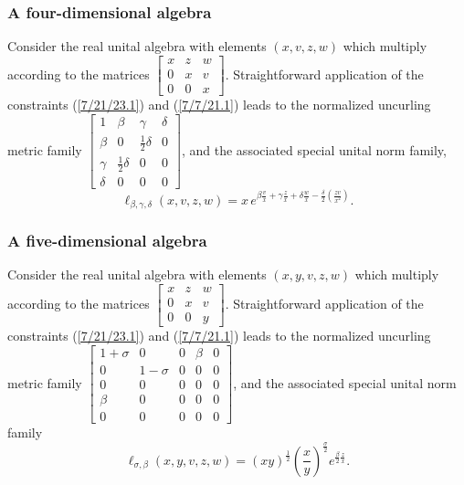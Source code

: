 \documentclass{amsart}
\numberwithin{equation}{section}
\theoremstyle{definition}
\numberwithin{theorem}{section}
\begin{document}
 \subsubsection{A four-dimensional algebra} Consider the real unital algebra with elements 
$(x,v,z,w)$ which multiply according to the matrices 
$\left[
\begin{array}{ccccc}
x & z & w   \\
0 & x & v \\
0 & 0 & x  
\end{array}
\right]$.
Straightforward application of the constraints (\ref{7/21/23.1}) and (\ref{7/7/21.1}) leads to the normalized uncurling metric family 
$\left[
\begin{array}{cccc}
1 & \beta & \gamma & \delta   \\
\beta & 0 & \frac{1}{2}\delta & 0 \\
\gamma & \frac{1}{2}\delta &  0 & 0   \\
\delta & 0 &  0 & 0
\end{array}
\right]$, and the associated special unital norm family,
\[ \ell_{\beta,\gamma,\delta}(x,v,z,w) = x\, e^{\beta\frac{v}{x} + \gamma\frac{z}{x} +\delta\frac{w}{x}- \frac{\delta}{2}\left(\frac{zv}{x^2}\right)}.\]


\subsubsection{A five-dimensional algebra}Consider the real unital algebra with elements 
$(x,y,v,z,w)$ which multiply according to the matrices
$\left[
\begin{array}{ccccc}
x & z & w   \\
0 & x & v \\
0 & 0 & y  
\end{array}
\right]$.
Straightforward application of the constraints (\ref{7/21/23.1}) and (\ref{7/7/21.1}) leads to the normalized uncurling metric family 
$\left[
\begin{array}{ccccc}
1+\sigma & 0 & 0 & \beta & 0   \\
0 & 1-\sigma & 0 & 0 & 0 \\
0 & 0 &  0 & 0 & 0  \\
\beta & 0 &  0 & 0 & 0  \\
0 & 0 &  0 & 0 & 0
\end{array}
\right]$, and the associated special unital norm family 
\[ \ell_{\sigma,\beta}(x,y,v,z,w) =  (xy)^{\frac{1}{2}}\left(\frac{x}{y}\right)^{\frac{\sigma}{2}} e^{\frac{\beta}{2} \frac{z}{x}}.\]
\end{document}
